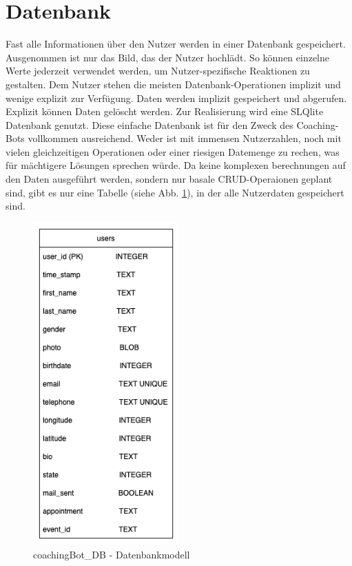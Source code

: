     \section{Datenbank} \label{Realisierung Datenbank}
        Fast alle Informationen über den Nutzer werden in einer Datenbank gespeichert. Ausgenommen ist nur das Bild, das der Nutzer hochlädt. So können einzelne Werte jederzeit verwendet werden, um Nutzer-spezifische Reaktionen zu gestalten.
        Dem Nutzer stehen die meisten Datenbank-Operationen implizit und wenige explizit zur Verfügung. Daten werden implizit gespeichert und abgerufen. Explizit können Daten gelöscht werden. Zur Realisierung wird eine SLQlite Datenbank genutzt. Diese einfache Datenbank ist für den Zweck des Coaching-Bots vollkommen ausreichend. Weder ist mit immensen Nutzerzahlen, noch mit vielen gleichzeitigen Operationen oder einer riesigen Datemenge zu rechen, was für mächtigere Lösungen sprechen würde.
        Da keine komplexen berechnungen auf den Daten ausgeführt werden, sondern nur basale CRUD-Operaionen geplant sind, gibt es nur eine Tabelle (siehe Abb. \ref{fig: data base model}), in der alle Nutzerdaten gespeichert sind.
        \begin{figure} %
            \centering
            \includegraphics[width=0.5\textwidth]{images/220325_PA28464_DataBaseModel.png}
            \caption{coachingBot\_DB - Datenbankmodell}
            \label{fig: data base model}
        \end{figure}


